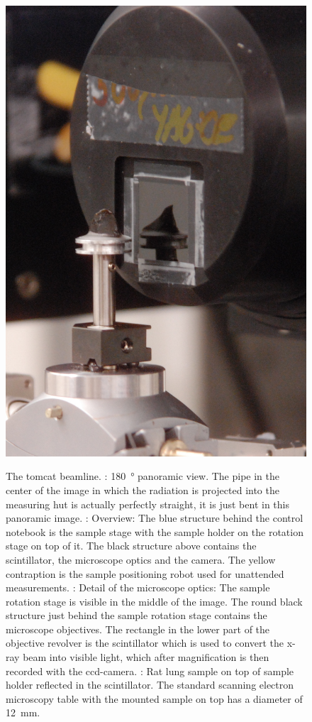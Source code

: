 \begin{figure}
{{			\includegraphics[width=\imsize]{img/TOMCAT3}%
			\label{subfig:TOMCAT3}%
		}%

	}%
	\caption[The \acs{tomcat} beamline]{The \ac{tomcat} beamline. : \SI{180}{\degree} panoramic view. The pipe in the center of the image in which the radiation is projected into the measuring hut is actually perfectly straight, it is just bent in this panoramic image. : Overview: The blue structure behind the control notebook is the sample stage with the sample holder on the rotation stage on top of it. The black structure above contains the scintillator, the microscope optics and the camera. The yellow contraption is the sample positioning robot used for unattended measurements. : Detail of the microscope optics: The sample rotation stage is visible in the middle of the image. The round black structure just behind the sample rotation stage contains the microscope objectives. The rectangle in the lower part of the objective revolver is the scintillator which is used to convert the x-ray beam into visible light, which after magnification is then recorded with the \ac{ccd}-camera. : Rat lung sample on top of sample holder reflected in the scintillator. The standard scanning electron microscopy table with the mounted sample on top has a diameter of \SI{12}{\milli\meter}.}%
	\label{fig:tomcat}
\end{figure}%

